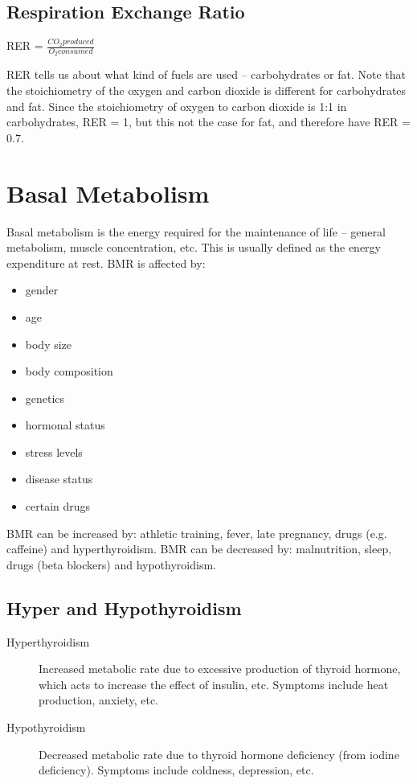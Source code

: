 \documentclass[a4paper, 12pt]{report}
\begin{document}
\subsection{Respiration Exchange Ratio}

\begin{center}
\large{RER = $\frac{CO_2 produced}{O_2 consumed}$}
\end{center}

RER tells us about what kind of fuels are used -- carbohydrates or fat.
Note that the stoichiometry of the oxygen and carbon dioxide is different for carbohydrates and fat.
Since the stoichiometry of oxygen to carbon dioxide is 1:1 in carbohydrates, RER = 1, but this not the case for fat, and therefore have RER = 0.7.

\section{Basal Metabolism}

Basal metabolism is the energy required for the maintenance of life -- general metabolism, muscle concentration, etc.
This is usually defined as the energy expenditure at rest.
BMR is affected by:
\begin{itemize}
\item gender
\item age 
\item body size
\item body composition
\item genetics
\item hormonal status
\item stress levels
\item disease status
\item certain drugs
\end{itemize}

BMR can be increased by: athletic training, fever, late pregnancy, drugs (e.g. caffeine) and hyperthyroidism.
BMR can be decreased by: malnutrition, sleep, drugs (beta blockers) and hypothyroidism.

\subsection{Hyper and Hypothyroidism}

\begin{description}
\item [Hyperthyroidism] Increased metabolic rate due to excessive production of thyroid hormone, which acts to increase the effect of insulin, etc. Symptoms include heat production, anxiety, etc.
\item [Hypothyroidism] Decreased metabolic rate due to thyroid hormone deficiency (from iodine deficiency). Symptoms include coldness, depression, etc.
\end{description}
\end{document}
